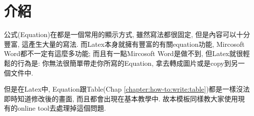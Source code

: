 

\section{介紹}

公式(Equation)在都是一個常用的顯示方式, 雖然寫法都很固定, 但是內容可以十分豐富, 這產生大量的寫法. 而Latex本身就擁有豐富的有關equation功能, Mircosoft Word都不一定有這麼多功能; 而且有一點Mircosoft Word是做不到, 但Latex就很輕鬆的行為是: 你無法很簡單帶走你所寫的Equation, 拿去轉成圖片或是copy到另一個文件中.

但是在Latex中, Equation跟Table(Chap \ref{chapter:how-to:write:table})都是一樣沒法即時知道修改後的畫面, 而且都會出現在基本教學中. 故本模板同樣教大家使用現有的online tool去處理掉這個問題.

\newpage
